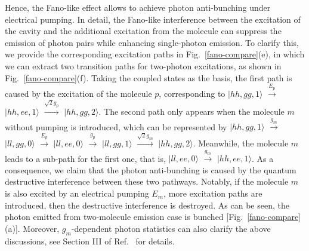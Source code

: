 \documentclass[aps,prb,
superscriptaddress,
,twocolumn
,floatfix,footinbib,longbibliography,
]{revtex4-2}
\begin{document}
Hence, the Fano-like effect allows to achieve photon anti-bunching under electrical pumping. In detail, the Fano-like interference between the excitation of the cavity and the additional excitation from the molecule can suppress the emission of photon pairs while enhancing single-photon emission. To clarify this, we provide the corresponding excitation paths in Fig.~\ref{fano-compare}(e), in which we can extract two transition paths for two-photon excitations, as shown in Fig.~\ref{fano-compare}(f). Taking the coupled states as the basis, the first path is caused by the excitation of the molecule $p$, corresponding to $|hh,gg,1\rangle$ $\stackrel{E_{p}}{\longrightarrow}$ $|hh,ee,1\rangle$ $\stackrel{\sqrt{2}g_{p}}{\longrightarrow}$ $|hh,gg,2\rangle$. The second path only appears when the molecule $m$ without pumping is introduced, which can be  represented by $|hh,gg,1\rangle$ $\stackrel{g_{m}}{\longrightarrow}$ $|ll,gg,0\rangle$ $\stackrel{E_{p}}{\longrightarrow}$ $|ll,ee,0\rangle$ $\stackrel{g_{p}}{\longrightarrow}$ $|ll,gg,1\rangle$ $\stackrel{\sqrt{2}g_{m}}{\longrightarrow}$ $|hh,gg,2\rangle$.
Meanwhile, the molecule $m$ leads to a sub-path for the first one, that is, $|ll,ee,0\rangle$ $\stackrel{g_{m}}{\longrightarrow}$ $|hh,ee,1\rangle$.
As a consequence, we claim that the photon anti-bunching is caused by the quantum destructive interference between these two pathways. Notably, if the molecule $m$ is also excited by an electrical pumping $E_{m}$, more excitation paths are introduced, then the destructive interference is destroyed. As can be seen, the photon emitted from two-molecule emission case is bunched [Fig.~\ref{fano-compare}(a)]. Moreover, $g_{m}$-dependent photon statistics can also clarify the above discussions, see Section III of Ref.~\cite{SupplementalMaterial} for details.

\end{document}
